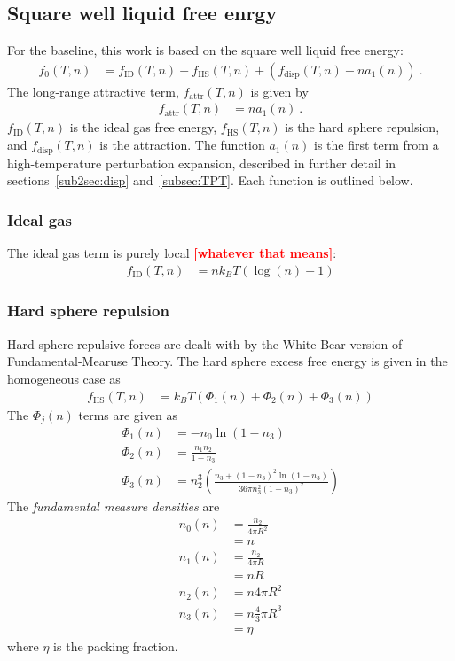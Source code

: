 \documentclass[letterpaper,twocolumn,amsmath,amssymb,prb]{revtex4-1}
\newcommand{\kT}{\ensuremath{k_BT}}
\newcommand{\fid}{\ensuremath{f_\text{ID}(T,n)}}
\newcommand{\fhs}{\ensuremath{f_\text{HS}(T,n)}}
\newcommand{\fdisp}{\ensuremath{f_\text{disp}(T,n)}}
\newcommand{\fattr}{\ensuremath{f_\text{attr}(T,n)}}
\newcommand{\1}{\ensuremath{\textbf{r}_1}}
\newcommand{\2}{\ensuremath{\textbf{r}_2}}
\newcommand{\3}{\ensuremath{\textbf{r}_3}}
\newcommand{\4}{\ensuremath{\textbf{r}_4}}
\newcommand{\fixme}[1]{\textcolor{red}{\textbf{[#1]}}}
\begin{document}
\subsection{Square well liquid free enrgy}\label{subsec:SW}
For the baseline, this work is based on the square well liquid free energy:\cite{Hughes13}
\begin{align}
  f_0(T,n) &= \fid + \fhs + \left( \fdisp - n a_1(n) \right) \ .
\end{align}
The long-range attractive term, $\fattr$ is given by
\begin{align}
  \fattr &= n a_1(n) \ .
\end{align}
$\fid$ is the ideal gas free energy, $\fhs$ is the hard sphere repulsion, and $\fdisp$ is the attraction. The function $a_1(n)$ is the first term from a high-temperature perturbation expansion, described in further detail in sections~\ref{sub2sec:disp} and~\ref{subsec:TPT}. Each function is outlined below.

\subsubsection{Ideal gas}\label{sub2sec:ID}
The ideal gas term is purely local \fixme{whatever that means}:
\begin{align}
  \fid &= n\kT\left(\log(n) - 1\right)
\end{align}

\subsubsection{Hard sphere repulsion}\label{sub2sec:HS}
Hard sphere repulsive forces are dealt with by the White Bear version of Fundamental-Mearuse Theory.\cite{Roth02} The hard sphere excess free energy is given in the homogeneous case as
\begin{align}
  \fhs &= \kT\left( \Phi_1(n) + \Phi_2(n) + \Phi_3(n) \right)
\end{align}
The $\Phi_j(n)$ terms are given as
\begin{align}
  \Phi_1(n) &= -n_0\ln(1 - n_3) \\
  \Phi_2(n) &= \frac{n_1n_2}{1 - n_3} \\
  \Phi_3(n) &= n_2^3\left( \frac{n_3 + (1 - n_3)^2\ln(1 - n_3)}{36\pi n_3^2(1 - n_3)^2} \right)
\end{align}
The \emph{fundamental measure densities} are
\begin{align}
  n_0(n) &= \frac{n_2}{4\pi R^2} \nonumber \\
  &= n \\
  n_1(n) &= \frac{n_2}{4\pi R} \nonumber \\
  &= nR \\
  n_2(n) &= n4\pi R^2 \\
  n_3(n) &= n\frac{4}{3}\pi R^3 \nonumber \\
  &= \eta
\end{align}
where $\eta$ is the packing fraction.
\end{document}
